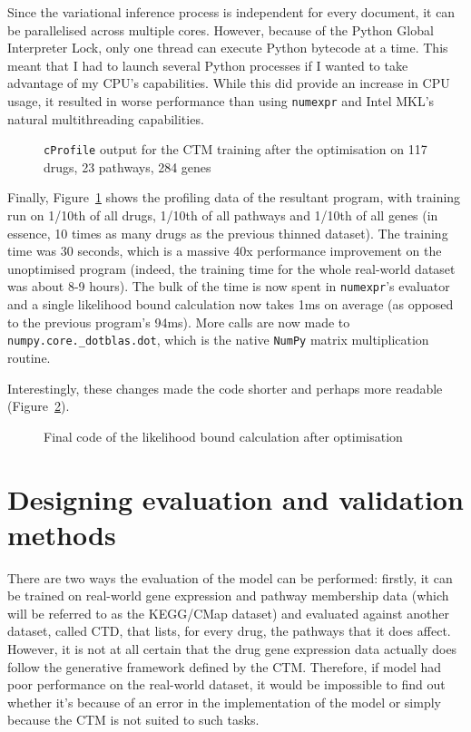 \documentclass[12pt,a4paper,twoside,openright]{report}
\begin{document}
Since the variational inference process is independent for every document, it can be parallelised across multiple cores. However, because of the Python Global Interpreter Lock, only one thread can execute Python bytecode at a time. This meant that I had to launch several Python processes if I wanted to take advantage of my CPU's capabilities. While this did provide an increase in CPU usage, it resulted in worse performance than using \texttt{numexpr} and Intel MKL's natural multithreading capabilities.

\begin{figure}
\caption{\texttt{cProfile} output for the CTM training after the optimisation on 117 drugs, 23 pathways, 284 genes}
\label{fig:ctm-profile-after}
\end{figure}

Finally, Figure~\ref{fig:ctm-profile-after} shows the profiling data of the resultant program, with training run on 1/10th of all drugs, 1/10th of all pathways and 1/10th of all genes (in essence, 10 times as many drugs as the previous thinned dataset). The training time was 30 seconds, which is a massive 40x performance improvement on the unoptimised program (indeed, the training time for the whole real-world dataset was about 8-9 hours). The bulk of the time is now spent in \texttt{numexpr}'s evaluator and a single likelihood bound calculation now takes 1ms on average (as opposed to the previous program's 94ms). More calls are now made to \texttt{numpy.core.\_dotblas.dot}, which is the native \texttt{NumPy} matrix multiplication routine.

Interestingly, these changes made the code shorter and perhaps more readable (Figure~\ref{fig:code-after-optimisation}).

\begin{figure}
\caption{Final code of the likelihood bound calculation after optimisation}
\label{fig:code-after-optimisation}
\end{figure}

\section{Designing evaluation and validation methods}

There are two ways the evaluation of the model can be performed: firstly, it can be trained on real-world gene expression and pathway membership data (which will be referred to as the KEGG/CMap dataset) and evaluated against another dataset, called CTD, that lists, for every drug, the pathways that it does affect. However, it is not at all certain that the drug gene expression data actually does follow the generative framework defined by the CTM. Therefore, if model had poor performance on the real-world dataset, it would be impossible to find out whether it's because of an error in the implementation of the model or simply because the CTM is not suited to such tasks.
\end{document}
